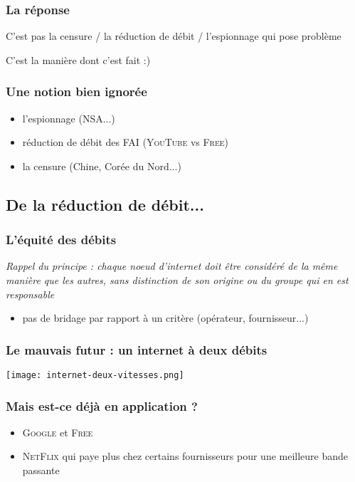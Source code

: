 \begin{frame}\frametitle{La réponse}
    \begin{center}
        {\Large C'est pas la censure / la réduction de débit / l'espionnage qui pose problème}

        \vspace{2em}

        {\Large C'est la manière dont c'est fait :)}
    \end{center}
\end{frame}


\begin{frame}\frametitle{Une notion bien ignorée}
    \begin{itemize}
        \item l'espionnage (\textsc{NSA}...)
        \item réduction de débit des FAI (\textsc{YouTube} vs \textsc{Free})
        \item la censure (Chine, Corée du Nord...)
    \end{itemize}
\end{frame}


\subsection{De la réduction de débit...}
\begin{frame}\frametitle{L'équité des débits}
    \emph{Rappel du principe : chaque noeud d'internet doit être considéré de
        la même manière que les autres, sans distinction de son origine ou du
    groupe qui en est responsable}

    \vspace{1em}
    \begin{itemize}
        \item pas de bridage par rapport à un critère (opérateur, fournisseur...)
    \end{itemize}
\end{frame}


\begin{frame}\frametitle{Le mauvais futur : un internet à deux débits}
    \begin{center}
        \texttt{[image: internet-deux-vitesses.png]}
    \end{center}
\end{frame}


\begin{frame}\frametitle{Mais est-ce déjà en application ?}
    \begin{itemize}
        \item \textsc{Google} et \textsc{Free}
        \item \textsc{NetFlix} qui paye plus chez certains fournisseurs pour une meilleure bande passante
    \end{itemize}
\end{frame}



